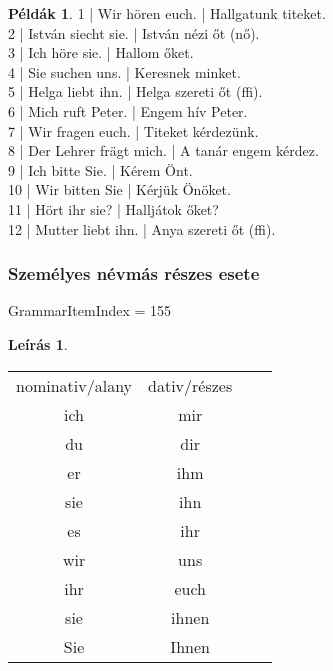 \documentclass{article}
\theoremstyle{definition}
\newtheorem*{exmp}{Példák}
\newtheorem*{desc}{Leírás}
\begin{document}
\begin{exmp}
1 | Wir hören euch. | Hallgatunk titeket.\\
2 | István siecht sie. | István nézi őt (nő).\\
3 | Ich höre sie. | Hallom őket.\\
4 | Sie suchen uns. | Keresnek minket.\\
5 | Helga liebt ihn. | Helga szereti őt (ffi).\\
6 | Mich ruft Peter. | Engem hív Peter.\\
7 | Wir fragen euch. | Titeket kérdezünk.\\
8 | Der Lehrer frägt mich. | A tanár engem kérdez.\\
9 | Ich bitte Sie. | Kérem Önt.\\
10 | Wir bitten Sie | Kérjük Önöket.\\
11 | Hört ihr sie? | Halljátok őket?\\
12 | Mutter liebt ihn. | Anya szereti őt (ffi).\\
\end{exmp}

\subsubsection{Személyes névmás részes esete}

GrammarItemIndex = 155

\begin{desc}
\begin{tabular}{cccc}
 nominativ/alany & dativ/részes \\
 ich & mir \\
 du & dir \\
 er & ihm \\
 sie & ihn \\
 es & ihr \\
 wir & uns \\
 ihr & euch \\
 sie & ihnen \\
 Sie & Ihnen \\
\end{tabular}
\end{desc}
\end{document}

